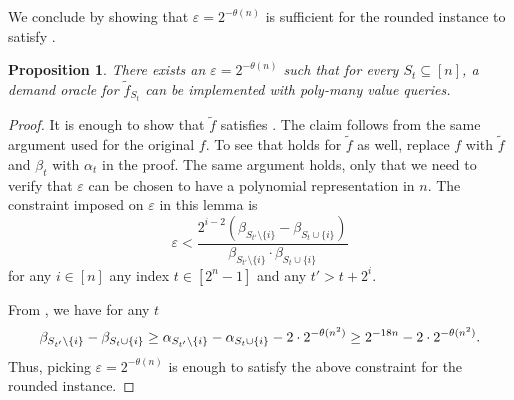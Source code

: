 \documentclass[11pt]{article}
\newtheorem{proposition}{Proposition}
\newcommand{\eps}{\varepsilon}
\newcommand{\tf}{\tilde{f}}
\begin{document}
We conclude by showing that $\eps = 2^{-\theta(n)}$ is sufficient for the rounded instance to satisfy .
\begin{proposition}\label{prop:ftlDemand}
    There exists an $\eps = 2^{-\theta(n)}$ such that for every $S_t \subseteq [n]$, a demand oracle for $\tf_{S_t}$ can be implemented with poly-many value queries.
\end{proposition}
\begin{proof}
    It is enough to show that $\tf$ satisfies . The claim follows from the same argument used for the original $f$.
    To see that  holds for $\tf$ as well, replace $f$ with $\tf$ and $\beta_t$ with $\alpha_t$ in the proof.
    The same argument holds, only that we need to verify that $\eps$ can be chosen to have a polynomial representation in $n$.
    The constraint imposed on $\eps$ in this lemma is
    $$
    \eps < \frac{2^{i-2}(\beta_{S_{t'}\setminus \{i\}} - \beta_{S_{t} \cup \{i\}})}{\beta_{S_{t'}\setminus \{i\}} \cdot \beta_{S_{t} \cup \{i\}}}
    $$
    for any $i \in [n]$ any index $t \in [2^n-1]$ and any $t' > t+2^i$.

    From , we have for any $t$
    $$
    \beta_{S_{t'}\setminus \{i\}} - \beta_{S_{t} \cup \{i\}} 
    \ge
    \alpha_{S_{t'}\setminus \{i\}} - \alpha_{S_{t} \cup \{i\}} 
    - 2 \cdot 2^{-\theta(n^2)}
    \ge
    2^{-18n} - 2 \cdot 2^{-\theta(n^2)}.
    $$
    Thus, picking $\eps = 2^{-\theta(n)}$ is enough to satisfy the above constraint for the rounded instance.
\end{proof}
\end{document}
